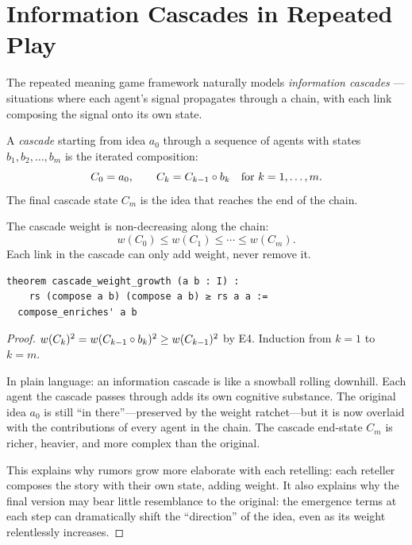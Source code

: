 \section{Information Cascades in Repeated Play}

The repeated meaning game framework naturally models \emph{information cascades}
---situations where each agent's signal propagates through a chain, with each
link composing the signal onto its own state.

\begin{definition}[Cascade]
\label{def:cascade}
A \emph{cascade} starting from idea $a_0$ through a sequence of agents with
states $b_1, b_2, \ldots, b_m$ is the iterated composition:
\[
  C_0 = a_0, \qquad C_k = C_{k-1} \circ b_k \quad \text{for } k = 1, \ldots, m.
\]
The final cascade state $C_m$ is the idea that reaches the end of the chain.
\end{definition}

\begin{theorem}
\label{thm:cascade-weight-mono}
The cascade weight is non-decreasing along the chain:
\[
  w(C_0) \leq w(C_1) \leq \cdots \leq w(C_m).
\]
Each link in the cascade can only add weight, never remove it.

\begin{lstlisting}[caption={Lean 4: Cascade weight growth}]
theorem cascade_weight_growth (a b : I) :
    rs (compose a b) (compose a b) ≥ rs a a :=
  compose_enriches' a b
\end{lstlisting}
\end{theorem}

\begin{proof}
$w(C_k)^2 = w(C_{k-1} \circ b_k)^2 \geq w(C_{k-1})^2$ by E4.  Induction
from $k = 1$ to $k = m$.

In plain language: an information cascade is like a snowball rolling downhill.
Each agent the cascade passes through adds its own cognitive substance.
The original idea $a_0$ is still ``in there''---preserved by the weight
ratchet---but it is now overlaid with the contributions of every agent in
the chain.  The cascade end-state $C_m$ is richer, heavier, and more complex
than the original.

This explains why rumors grow more elaborate with each retelling: each
reteller composes the story with their own state, adding weight.  It also
explains why the final version may bear little resemblance to the original:
the emergence terms at each step can dramatically shift the ``direction''
of the idea, even as its weight relentlessly increases.
\end{proof}

